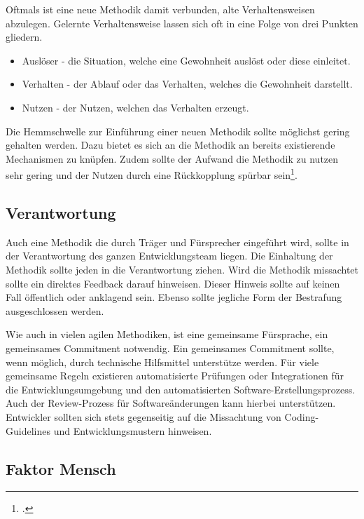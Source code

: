 Oftmals ist eine neue Methodik damit verbunden, alte Verhaltensweisen abzulegen.
Gelernte Verhaltensweise lassen sich oft in eine Folge von drei Punkten gliedern.
\begin{itemize}
\item Auslöser - die Situation, welche eine Gewohnheit auslöst oder diese einleitet.
\item Verhalten - der Ablauf oder das Verhalten, welches die Gewohnheit darstellt.
\item Nutzen - der Nutzen, welchen das Verhalten erzeugt.
\end{itemize}
Die Hemmschwelle zur Einführung einer neuen Methodik sollte möglichst gering gehalten werden. Dazu bietet es sich an die Methodik an bereits existierende Mechanismen zu knüpfen. Zudem sollte der Aufwand die Methodik zu nutzen sehr gering und der Nutzen durch eine Rückkopplung spürbar sein\footcite[vgl.][]{steps-of-habit}.

\subsection{Verantwortung}

Auch eine Methodik die durch Träger und Fürsprecher eingeführt wird, sollte in der Verantwortung des ganzen Entwicklungsteam liegen. Die Einhaltung der Methodik sollte jeden in die Verantwortung ziehen. Wird die Methodik missachtet sollte ein direktes Feedback darauf hinweisen. Dieser Hinweis sollte auf keinen Fall öffentlich oder anklagend sein. Ebenso sollte jegliche Form der Bestrafung ausgeschlossen werden.

Wie auch in vielen agilen Methodiken, ist eine gemeinsame Fürsprache, ein gemeinsames \glqq \gls{Commitment}\grqq{} notwendig. Ein gemeinsames Commitment sollte, wenn möglich, durch technische Hilfsmittel unterstütze werden. Für viele gemeinsame Regeln existieren automatisierte Prüfungen oder Integrationen für die Entwicklungsumgebung und den automatisierten Software-Erstellungsprozess.
Auch der Review-Prozess für Softwareänderungen kann hierbei unterstützen. Entwickler sollten sich stets gegenseitig auf die Missachtung von Coding-Guidelines und Entwicklungsmustern hinweisen.

\subsection{Faktor Mensch}

